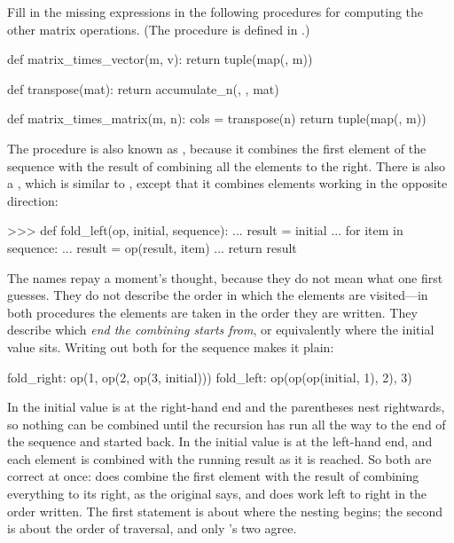 \begin{exerciseGroup}
Fill in the missing expressions in the following procedures for computing the
other matrix operations.  (The procedure  is defined in
.)

\begin{syntaxForm}
def matrix_times_vector(m, v):
    return tuple(map(, m))

def transpose(mat):
    return accumulate_n(, , mat)

def matrix_times_matrix(m, n):
    cols = transpose(n)
    return tuple(map(, m))
\end{syntaxForm}

\label{Exercise 2.38}
 The  procedure
is also known as , because it combines the first element of
the sequence with the result of combining all the elements to the right.  There
is also a , which is similar to , except
that it combines elements working in the opposite direction:

\begin{codeBlock}
>>> def fold_left(op, initial, sequence):
...     result = initial
...     for item in sequence:
...         result = op(result, item)
...     return result
\end{codeBlock}

\noindent
The names repay a moment's thought, because they do not mean what one first
guesses.  They do not describe the order in which the elements are visited---in
both procedures the elements are taken in the order they are written.  They
describe which \emph{end the combining starts from}, or equivalently where the
initial value sits.  Writing out both for the sequence  makes
it plain:

\begin{codeBlock}
fold_right:  op(1, op(2, op(3, initial)))
fold_left:   op(op(op(initial, 1), 2), 3)
\end{codeBlock}

\noindent
In  the initial value is at the right-hand end and the
parentheses nest rightwards, so nothing can be combined until the recursion has
run all the way to the end of the sequence and started back.  In
 the initial value is at the left-hand end, and each element
is combined with the running result as it is reached.  So both are correct at
once:  does combine the first element with the result of
combining everything to its right, as the original says, and 
does work left to right in the order written.  The first statement is about
where the nesting begins; the second is about the order of traversal, and only
's two agree.


\end{exerciseGroup}
